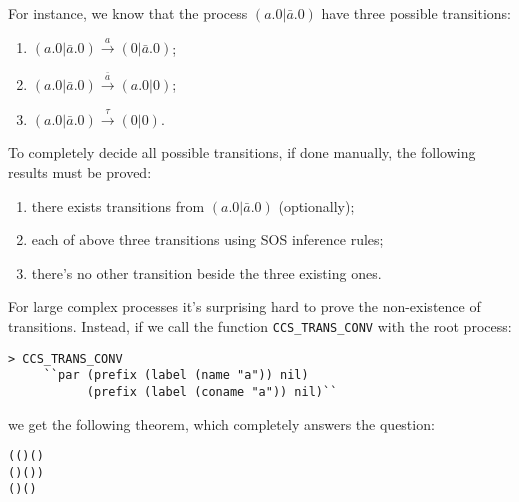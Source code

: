 For instance, we know that the process $(a.0 | \bar{a}.0)$ have three
possible transitions:
\begin{enumerate}
\item $(a.0 | \bar{a}.0) \overset{a}{\longrightarrow} (0 | \bar{a}.0)$;
\item $(a.0 | \bar{a}.0) \overset{\bar{a}}{\longrightarrow} (a.0 | 0)$;
\item $(a.0 | \bar{a}.0) \overset{\tau}{\longrightarrow} (0 | 0)$.
\end{enumerate}
To completely decide all possible transitions, if done manually, the
following results must be proved:
\begin{enumerate}
\item there exists transitions from $(a.0 | \bar{a}.0)$ (optionally);
\item each of above three transitions using SOS inference rules;
\item there's no other transition beside the three existing ones.
\end{enumerate}
For large complex processes it's surprising hard to prove the
non-existence of transitions. Instead, if we call the function \texttt{CCS\_TRANS\_CONV} with the
root process:
\begin{lstlisting}
> CCS_TRANS_CONV
	 ``par (prefix (label (name "a")) nil)
	       (prefix (label (coname "a")) nil)``
\end{lstlisting}
we get the following theorem, which completely answers the question:
\begin{alltt}
\HOLTokenTurnstile{}   \HOLSymConst{\ensuremath{\parallel}}   \HOLTokenTransBegin{}\HOLTokenTransEnd {} \HOLSymConst{\HOLTokenEquiv{}}
   (( \HOLSymConst{=}  ) \HOLSymConst{\HOLTokenConj{}} ( \HOLSymConst{=}  \HOLSymConst{\ensuremath{\parallel}}  ) \HOLSymConst{\HOLTokenDisj{}}
    ( \HOLSymConst{=}  ) \HOLSymConst{\HOLTokenConj{}} ( \HOLSymConst{=}   \HOLSymConst{\ensuremath{\parallel}} )) \HOLSymConst{\HOLTokenDisj{}}
   ( \HOLSymConst{=} \HOLSymConst{\ensuremath{\tau}}) \HOLSymConst{\HOLTokenConj{}} ( \HOLSymConst{=}  \HOLSymConst{\ensuremath{\parallel}} )
\end{alltt}
